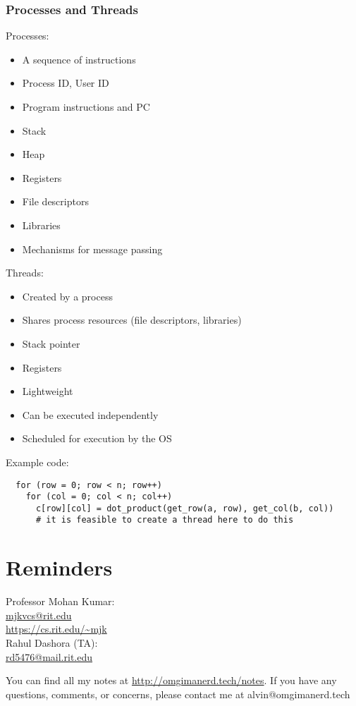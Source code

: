 \documentclass[letterpaper, 12pt]{math}
\begin{document}
\subsubsection*{Processes and Threads}
Processes:
\begin{itemize}
  \item A sequence of instructions
  \item Process ID, User ID
  \item Program instructions and PC
  \item Stack
  \item Heap
  \item Registers
  \item File descriptors
  \item Libraries
  \item Mechanisms for message passing
\end{itemize}
Threads:
\begin{itemize}
  \item Created by a process
  \item Shares process resources (file descriptors, libraries)
  \item Stack pointer
  \item Registers
  \item Lightweight
  \item Can be executed independently
  \item Scheduled for execution by the OS
\end{itemize}
Example code:
\begin{lstlisting}
  for (row = 0; row < n; row++)
    for (col = 0; col < n; col++)
      c[row][col] = dot_product(get_row(a, row), get_col(b, col))
      # it is feasible to create a thread here to do this
\end{lstlisting}

\section*{Reminders}
Professor Mohan Kumar: \\
\url{mjkvcs@rit.edu} \\
\url{https://cs.rit.edu/~mjk} \\

\noindent Rahul Dashora (TA): \\
\url{rd5476@mail.rit.edu} \\

\begin{center}
  You can find all my notes at \url{http://omgimanerd.tech/notes}. If you have
  any questions, comments, or concerns, please contact me at
  alvin@omgimanerd.tech
\end{center}
\end{document}
